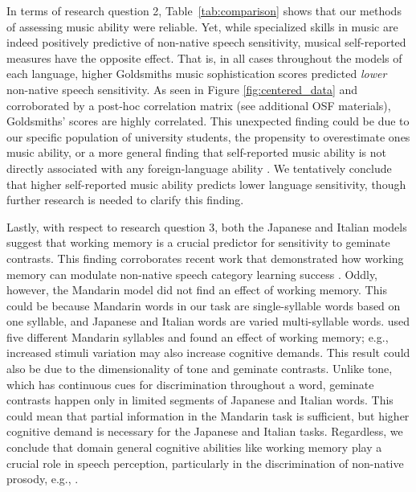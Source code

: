 \documentclass[a4paper]{article}
\begin{document}
In terms of research question 2, Table~\ref{tab:comparison} shows that our methods of assessing music ability were reliable. Yet, while specialized skills in music are indeed positively predictive of non-native speech sensitivity, musical self-reported measures have the opposite effect. That is, in all cases throughout the models of each language, higher Goldsmiths music sophistication scores predicted \emph{lower} non-native speech sensitivity. As seen in Figure \ref{fig:centered_data} and corroborated by a post-hoc correlation matrix (see additional OSF materials), Goldsmiths' scores are highly correlated. This unexpected finding could be due to our specific population of university students, the propensity to overestimate ones music ability, or a more general finding that self-reported music ability is not directly associated with any foreign-language ability \cite{larrouy_maestri_et_al_2023_selfevaluation,correia_et_al_2023_selfawareness,schellenberg_et_al_2023_musical}. We tentatively conclude that higher self-reported music ability predicts lower language sensitivity, though further research is needed to clarify this finding. 

Lastly, with respect to research question 3, both the Japanese and Italian models suggest that working memory is a crucial predictor for sensitivity to geminate contrasts. This finding corroborates recent work that demonstrated how working memory can modulate non-native speech category learning success \cite{mchaney_et_al_2021_workingmemory}. Oddly, however, the Mandarin model did not find an effect of working memory. This could be because Mandarin words in our task are single-syllable words based on one syllable, and Japanese and Italian words are varied multi-syllable words. \cite{mchaney_et_al_2021_workingmemory} used five different Mandarin syllables and found an effect of working memory; e.g., increased stimuli variation may also increase cognitive demands. This result could also be due to the dimensionality of tone and geminate contrasts. Unlike tone, which has continuous cues for discrimination throughout a word, geminate contrasts happen only in limited segments of Japanese and Italian words. This could mean that partial information in the Mandarin task is sufficient, but higher cognitive demand is necessary for the Japanese and Italian tasks. Regardless, we conclude that domain general cognitive abilities like working memory play a crucial role in speech perception, particularly in the discrimination of non-native prosody, e.g., \cite{Kachlicka_Saito_Tierney_2019}.
\end{document}
